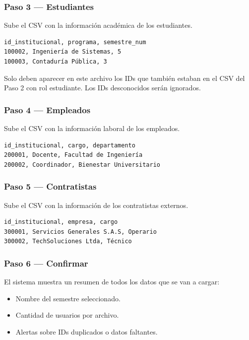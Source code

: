 \documentclass[12pt, a4paper]{article}
\begin{document}
\subsubsection{Paso 3 — Estudiantes}

Sube el CSV con la información académica de los estudiantes.

\begin{lstlisting}
id_institucional, programa, semestre_num
100002, Ingeniería de Sistemas, 5
100003, Contaduría Pública, 3
\end{lstlisting}

\begin{nota}
  Solo deben aparecer en este archivo los IDs que también estaban en
  el CSV del Paso 2 con rol estudiante. Los IDs desconocidos
  serán ignorados.
\end{nota}

\subsubsection{Paso 4 — Empleados}

Sube el CSV con la información laboral de los empleados.

\begin{lstlisting}
id_institucional, cargo, departamento
200001, Docente, Facultad de Ingeniería
200002, Coordinador, Bienestar Universitario
\end{lstlisting}

\subsubsection{Paso 5 — Contratistas}

Sube el CSV con la información de los contratistas externos.

\begin{lstlisting}
id_institucional, empresa, cargo
300001, Servicios Generales S.A.S, Operario
300002, TechSoluciones Ltda, Técnico
\end{lstlisting}

\subsubsection{Paso 6 — Confirmar}

El sistema muestra un resumen de todos los datos que se van a cargar:
\begin{itemize}
  \item Nombre del semestre seleccionado.
  \item Cantidad de usuarios por archivo.
  \item Alertas sobre IDs duplicados o datos faltantes.
\end{itemize}
\end{document}
